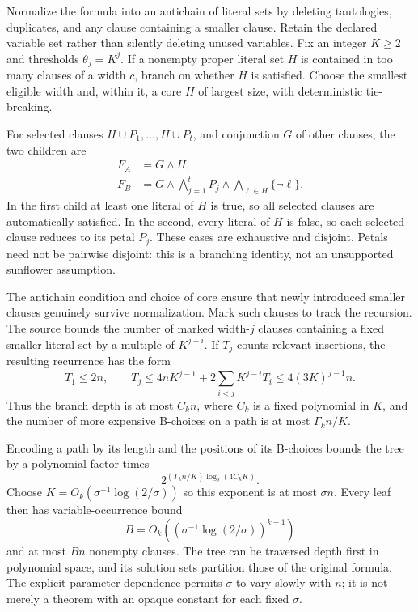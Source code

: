 \documentclass[11pt,a4paper]{article}
\numberwithin{equation}{section}
\theoremstyle{definition}
\theoremstyle{remark}
\begin{document}
Normalize the formula into an antichain of literal sets by deleting tautologies,
duplicates, and any clause containing a smaller clause. Retain the declared
variable set rather than silently deleting unused variables. Fix an integer
$K\ge2$ and thresholds $\theta_j=K^j$. If a nonempty proper literal set $H$
is contained in too many clauses of a width $c$, branch on whether $H$ is
satisfied. Choose the smallest eligible width and, within it, a core $H$ of
largest size, with deterministic tie-breaking.

For selected clauses $H\cup P_1,\ldots,H\cup P_t$, and conjunction $G$ of
other clauses, the two children are
\begin{align}
 F_A&=G\wedge H,\label{eq:branchA}\\
 F_B&=G\wedge\bigwedge_{j=1}^tP_j
                   \wedge\bigwedge_{\ell\in H}\{\neg\ell\}.
                                                        \label{eq:branchB}
\end{align}
In the first child at least one literal of $H$ is true, so all selected clauses
are automatically satisfied. In the second, every literal of $H$ is false,
so each selected clause reduces to its petal $P_j$. These cases are exhaustive
and disjoint. Petals need not be pairwise disjoint: this is a branching identity,
not an unsupported sunflower assumption.

The antichain condition and choice of core ensure that newly introduced
smaller clauses genuinely survive normalization. Mark such clauses to track
the recursion. The source bounds the number of marked width-$j$ clauses
containing a fixed smaller literal set by a multiple of $K^{j-i}$.
If $T_j$ counts relevant insertions, the resulting recurrence has the form
\[
 T_1\le2n,\qquad
 T_j\le4nK^{j-1}+2\sum_{i<j}K^{j-i}T_i
       \le4(3K)^{j-1}n.
\]
Thus the branch depth is at most $C_kn$, where $C_k$ is a fixed polynomial
in $K$, and the number of more expensive B-choices on a path is at most
$\Gamma_kn/K$.

Encoding a path by its length and the positions of its B-choices bounds the
tree by a polynomial factor times
\[
 2^{(\Gamma_kn/K)\log_2(4C_kK)}.
\]
Choose $K=O_k(\sigma^{-1}\log(2/\sigma))$ so this exponent is at most
$\sigma n$. Every leaf then has variable-occurrence bound
\begin{equation}\label{eq:sparseB}
 B=O_k\left((\sigma^{-1}\log(2/\sigma))^{k-1}\right)
\end{equation}
and at most $Bn$ nonempty clauses. The tree can be traversed depth first in
polynomial space, and its solution sets partition those of the original
formula. The explicit parameter dependence permits $\sigma$ to vary slowly
with $n$; it is not merely a theorem with an opaque constant for each fixed
$\sigma$.
\end{document}
